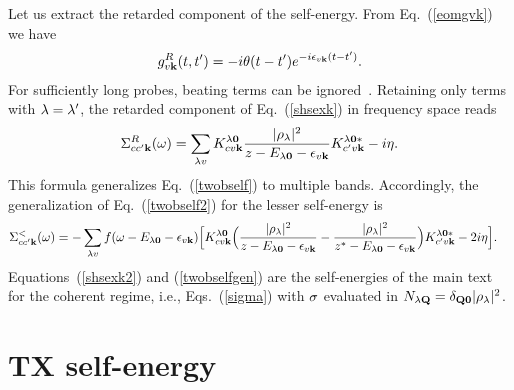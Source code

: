 \documentclass[twocolumn,aps,a4paper,superscriptaddress]{revtex4-2}
\begin{document}
\begin{widetext}
Let us extract the retarded component of the self-energy. From Eq.~(\ref{eomgvk}) we have
\begin{align}
g_{v{\mathbf k}}^{R}(t,t')=-i\theta(t-t')e^{-i\epsilon_{v{\mathbf k}}(t-t')}.
\end{align}
For sufficiently long probes, beating terms can be
ignored~\cite{rustagi_coherent_2019,zhang_long-lived_2025}.
Retaining only terms with $\lambda=\lambda'$, the retarded component of
Eq.~(\ref{shsexk}) in frequency space reads
\begin{align}
\Sigma^{R}_{cc'{\mathbf k}}(\omega)=
\sum_{\lambda v}
K_{cv{\mathbf k}}^{\lambda\mathbf 0}\frac{|\rho_{\lambda}|^{2}}{z-E_{\lambda\mathbf 0}-\epsilon_{v{\mathbf k}}}
K^{\lambda\mathbf 0\ast}_{c'v{\mathbf k}}-i\eta.
\label{shsexk2}
\end{align}
This formula generalizes Eq.~(\ref{twobself}) to multiple bands.
Accordingly, the generalization of Eq.~(\ref{twobself2}) for the lesser
self-energy is
\begin{align}
\Sigma^{<}_{cc'{\mathbf k}}(\omega)&=-\sum_{\lambda v}
f(\omega-E_{\lambda\mathbf 0}-\epsilon_{v{\mathbf k}})
\Big[
K_{cv{\mathbf k}}^{\lambda\mathbf 0}\Big(\frac{|\rho_{\lambda}|^{2}}{z-E_{\lambda\mathbf 0}-\epsilon_{v{\mathbf k}}}
-\frac{|\rho_{\lambda}|^{2}}{z^{\ast}-E_{\lambda\mathbf 0}-\epsilon_{v{\mathbf k}}}\Big)
K^{\lambda\mathbf 0\ast}_{c'v{\mathbf k}}
-2i\eta\Big].
\label{twobselfgen}
\end{align}
Equations~(\ref{shsexk2}) and (\ref{twobselfgen}) are the
self-energies of the main text for the coherent regime, i.e.,
Eqs.~(\ref{sigma}) with $\sigma$ evaluated in
$N_{\lambda{\mathbf Q}}=\delta_{{\mathbf Q}\mathbf 0}|\rho_{\lambda}|^{2}$.

\section{TX self-energy}
\label{txapp}


\end{widetext}
\end{document}
